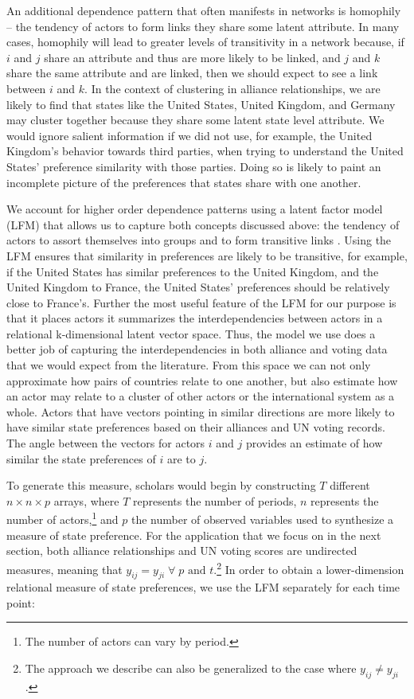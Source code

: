 An additional dependence pattern that often manifests in networks is homophily -- the tendency of actors to form links they share some latent attribute. In many cases, homophily will lead to greater levels of transitivity in a network because, if $i$ and $j$ share an attribute and thus are more likely to be linked, and $j$ and $k$ share the same attribute and are linked, then we should expect to see a link between $i$ and $k$. In the context of clustering in alliance relationships, we are likely to find that states like the United States, United Kingdom, and Germany may cluster together because they share some latent state level attribute. We would ignore salient information if we did not use, for example, the United Kingdom's behavior towards third parties, when trying to understand the United States' preference similarity with those parties. Doing so is likely to paint an incomplete picture of the preferences that states share with one another.

We account for higher order dependence patterns using a latent factor model (LFM) that allows us to capture both concepts discussed above: the tendency of actors to assort themselves into groups and to form transitive links \citep{hoff:2005,hoff:etal:2013,minhas:etal:2018}. Using the LFM ensures that similarity in preferences are likely to be transitive, for example, if the United States has similar preferences to the United Kingdom, and the United Kingdom to France, the United States' preferences should be relatively close to France's. Further the most useful feature of the LFM for our purpose is that it places actors it summarizes the interdependencies between actors in a relational k-dimensional latent vector space. Thus, the model we use does a better job of capturing the interdependencies in both alliance and voting data that we would expect from the literature. From this space we can not only approximate how pairs of countries relate to one another, but also estimate how an actor may relate to a cluster of other actors or the international system as a whole. Actors that have vectors pointing in similar directions are more likely to have similar state preferences based on their alliances and UN voting records. The angle between the vectors for actors $i$ and $j$ provides an estimate of how similar the state preferences of $i$ are to $j$. 

To generate this measure, scholars would begin by constructing $T$ different $n \times n \times p$ arrays, where $T$ represents the number of periods, $n$ represents the number of actors,\footnote{The number of actors can vary by period.} and $p$ the number of observed variables used to synthesize a measure of state preference. For the application that we focus on in the next section, both alliance relationships and UN voting scores are undirected measures, meaning that $y_{ij} = y_{ji} \; \forall \; p \text{ and } t$.\footnote{The approach we describe can also be generalized to the case where $y_{ij} \neq y_{ji}$.} In order to obtain a lower-dimension relational measure of state preferences, we use the LFM separately for each time point: 


